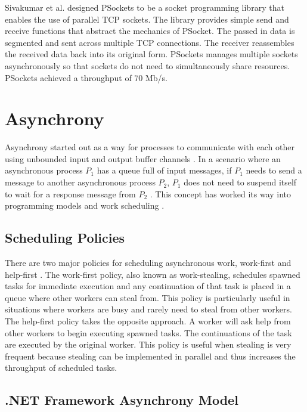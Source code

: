 Sivakumar et al. designed PSockets \cite{Sivakumar2000psockets} to be a socket programming library that enables the use of parallel TCP sockets. The library provides simple send and receive functions that abstract the mechanics of PSocket. The passed in data is segmented and sent across multiple TCP connections. The receiver reassembles the received data back into its original form. PSockets manages multiple sockets asynchronously so that sockets do not need to simultaneously share resources. PSockets achieved a throughput of 70 Mb/s.

\section{Asynchrony}

Asynchrony started out as a way for processes to communicate with each other using unbounded input and output buffer channels \cite{Josephs1989}\cite{He1990}. In a scenario where an asynchronous process $P_1$ has a queue full of input messages, if $P_1$ needs to send a message to another asynchronous process $P_2$, $P_1$ does not need to suspend itself to wait for a response message from $P_2$ \cite{He1990}. This concept has worked its way into programming models and work scheduling \cite{Guo2009}\cite{Leijen2009}\cite{syme2011f}.

\subsection{Scheduling Policies}

There are two major policies for scheduling asynchronous work, work-first and help-first \cite{Guo2009}. The work-first policy, also known as work-stealing, schedules spawned tasks for immediate execution and any continuation of that task is placed in a queue where other workers can steal from. This policy is particularly useful in situations where workers are busy and rarely need to steal from other workers. The help-first policy takes the opposite approach. A worker will ask help from other workers to begin executing spawned tasks. The continuations of the task are executed by the original worker. This policy is useful when stealing is very frequent because stealing can be implemented in parallel and thus increases the throughput of scheduled tasks.

\subsection{.NET Framework Asynchrony Model}

